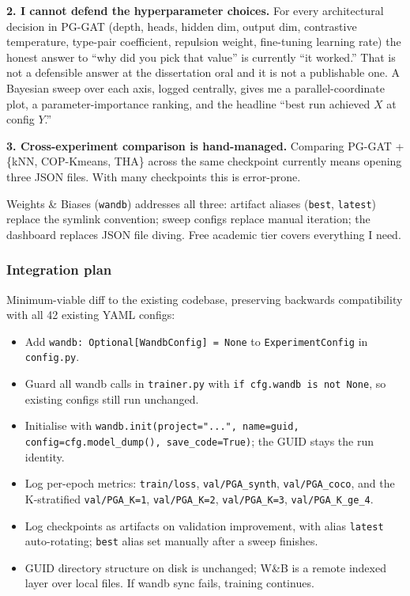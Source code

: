 \textbf{2. I cannot defend the hyperparameter choices.} For every architectural decision in PG-GAT (depth, heads, hidden dim, output dim, contrastive temperature, type-pair coefficient, repulsion weight, fine-tuning learning rate) the honest answer to ``why did you pick that value'' is currently ``it worked.'' That is not a defensible answer at the dissertation oral and it is not a publishable one. A Bayesian sweep over each axis, logged centrally, gives me a parallel-coordinate plot, a parameter-importance ranking, and the headline ``best run achieved $X$ at config $Y$.''

\textbf{3. Cross-experiment comparison is hand-managed.} Comparing PG-GAT + \{kNN, COP-Kmeans, THA\} across the same checkpoint currently means opening three JSON files. With many checkpoints this is error-prone.

Weights \& Biases (\texttt{wandb}) addresses all three: artifact aliases (\texttt{best}, \texttt{latest}) replace the symlink convention; sweep configs replace manual iteration; the dashboard replaces JSON file diving. Free academic tier covers everything I need.

\subsubsection{Integration plan}

Minimum-viable diff to the existing codebase, preserving backwards compatibility with all 42 existing YAML configs:

\begin{itemize}
    \item Add \texttt{wandb: Optional[WandbConfig] = None} to \texttt{ExperimentConfig} in \texttt{config.py}.
    \item Guard all wandb calls in \texttt{trainer.py} with \texttt{if cfg.wandb is not None}, so existing configs still run unchanged.
    \item Initialise with \texttt{wandb.init(project="...", name=guid, config=cfg.model\_dump(), save\_code=True)}; the GUID stays the run identity.
    \item Log per-epoch metrics: \texttt{train/loss}, \texttt{val/PGA\_synth}, \texttt{val/PGA\_coco}, and the K-stratified \texttt{val/PGA\_K=1}, \texttt{val/PGA\_K=2}, \texttt{val/PGA\_K=3}, \texttt{val/PGA\_K\_ge\_4}.
    \item Log checkpoints as artifacts on validation improvement, with alias \texttt{latest} auto-rotating; \texttt{best} alias set manually after a sweep finishes.
    \item GUID directory structure on disk is unchanged; W\&B is a remote indexed layer over local files. If wandb sync fails, training continues.
\end{itemize}

